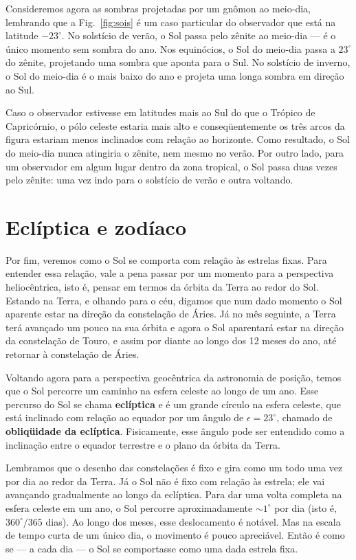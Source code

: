 Consideremos agora as sombras projetadas por um gnômon ao meio-dia, lembrando que a Fig.~\ref{fig:sois} é um caso particular do observador que está na latitude $-23^{\circ}$. No solstício de verão, o Sol passa pelo zênite ao meio-dia --- é o único momento sem sombra do ano. Nos equinócios, o Sol do meio-dia passa a $23^{\circ}$ do zênite, projetando uma sombra que aponta para o Sul. No solstício de inverno, o Sol do meio-dia é o mais baixo do ano e projeta uma longa sombra em direção ao Sul.

Caso o observador estivesse em latitudes mais ao Sul do que o Trópico de Capricórnio, o pólo celeste estaria mais alto e conseqüentemente os três arcos da figura estariam menos inclinados com relação ao horizonte. Como resultado, o Sol do meio-dia nunca atingiria o zênite, nem mesmo no verão. Por outro lado, para um observador em algum lugar dentro da zona tropical, o Sol passa duas vezes pelo zênite: uma vez indo para o solstício de verão e outra voltando.

\section{Eclíptica e zodíaco}

Por fim, veremos como o Sol se comporta com relação às estrelas fixas. Para entender essa relação, vale a pena passar por um momento para a perspectiva heliocêntrica, isto é, pensar em termos da órbita da Terra ao redor do Sol. Estando na Terra, e olhando para o céu, digamos que num dado momento o Sol aparente estar na direção da constelação de Áries. Já no mês seguinte, a Terra terá avançado um pouco na sua órbita e agora o Sol aparentará estar na direção da constelação de Touro, e assim por diante ao longo dos 12 meses do ano, até retornar à constelação de Áries.

Voltando agora para a perspectiva geocêntrica da astronomia de posição, temos que o Sol percorre um caminho na esfera celeste ao longo de um ano. Esse percurso do Sol se chama \textbf{eclíptica} e é um grande círculo na esfera celeste, que está inclinado com relação ao equador por um ângulo de $\epsilon = 23^{\circ}$, chamado de \textbf{obliqüidade da eclíptica}. Fisicamente, esse ângulo pode ser entendido como a inclinação entre o equador terrestre e o plano da órbita da Terra. 

Lembramos que o desenho das constelações é fixo e gira como um todo uma vez por dia ao redor da Terra. Já o Sol não é fixo com relação às estrela; ele vai avançando gradualmente ao longo da eclíptica. Para dar uma volta completa na esfera celeste em um ano, o Sol percorre aproximadamente ${\sim}1^{\circ}$ por dia (isto é, $360^{\circ} / 365$ dias). Ao longo dos meses, esse deslocamento é notável. Mas na escala de tempo curta de um único dia, o movimento é pouco apreciável. Então é como se --- a cada dia --- o Sol se comportasse como uma dada estrela fixa.

